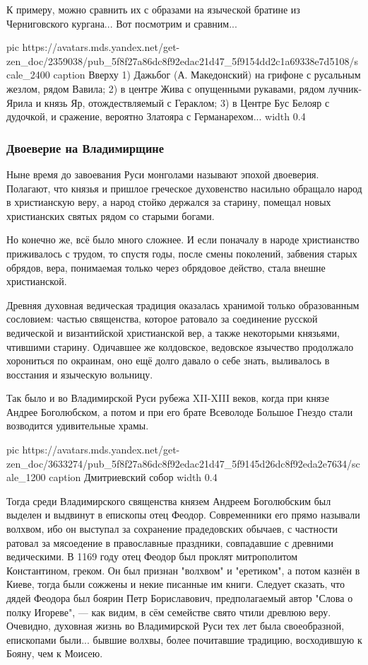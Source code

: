 К примеру, можно сравнить их с образами на языческой братине из Черниговского
кургана... Вот посмотрим и сравним...

\ifcmt
pic https://avatars.mds.yandex.net/get-zen_doc/2359038/pub_5f8f27a86dc8f92edac21d47_5f9154dd2c1a69338e7d5108/scale_2400
caption Вверху 1) Дажьбог (А. Македонский) на грифоне с русальным жезлом, рядом Вавила; 2) в центре Жива с опущенными рукавами, рядом лучник-Ярила и князь Яр, отождествляемый с Гераклом; 3) в Центре Бус Белояр с дудочкой, и сражение, вероятно Златояра с Германарехом...
width 0.4
\fi

\subsubsection{Двоеверие на Владимирщине}

Ныне время до завоевания Руси монголами называют эпохой двоеверия. Полагают,
что князья и пришлое греческое духовенство насильно обращало народ в
христианскую веру, а народ стойко держался за старину, помещал новых
христианских святых рядом со старыми богами.

Но конечно же, всё было много сложнее. И если поначалу в народе христианство
приживалось с трудом, то спустя годы, после смены поколений, забвения старых
обрядов, вера, понимаемая только через обрядовое действо, стала внешне
христианской.

Древняя духовная ведическая традиция оказалась хранимой только образованным
сословием: частью священства, которое ратовало за соединение русской ведической
и византийской христианской вер, а также некоторыми князьями, чтившими старину.
Одичавшее же колдовское, ведовское язычество продолжало хорониться по окраинам,
оно ещё долго давало о себе знать, выливалось в восстания и языческую вольницу.

Так было и во Владимирской Руси рубежа XII-XIII веков, когда при князе Андрее
Боголюбском, а потом и при его брате Всеволоде Большое Гнездо стали возводится
удивительные храмы.

\ifcmt
pic https://avatars.mds.yandex.net/get-zen_doc/3633274/pub_5f8f27a86dc8f92edac21d47_5f9145d26dc8f92eda2e7634/scale_1200
caption Дмитриевский собор
width 0.4
\fi

Тогда среди Владимирского священства князем Андреем Боголюбским был выделен и
выдвинут в епископы отец Феодор. Современники его прямо называли волхвом, ибо
он выступал за сохранение прадедовских обычаев, с частности ратовал за
мясоедение в православные праздники, совпадавшие с древними ведическими. В 1169
году отец Феодор был проклят митрополитом Константином, греком. Он был признан
"волхвом" и "еретиком", а потом казнён в Киеве, тогда были сожжены и некие
писанные им книги. Следует сказать, что дядей Феодора был боярин Петр
Бориславович, предполагаемый автор "Слова о полку Игореве", — как видим, в сём
семействе свято чтили древлюю веру. Очевидно, духовная жизнь во Владимирской
Руси тех лет была своеобразной, епископами были... бывшие волхвы, более
почитавшие традицию, восходившую к Бояну, чем к Моисею.

